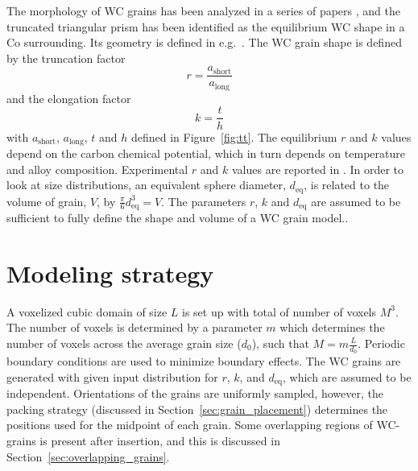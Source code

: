 \documentclass[3p,12pt]{elsarticle}
\begin{document}
The morphology of WC grains has been analyzed in a series of papers \cite{christensen_quantitative_2005,christensen_morphology_2007,lay_morphology_2008}, and the truncated triangular prism has been identified as the equilibrium WC shape in a Co surrounding.
Its geometry is defined in e.g.\ \cite{christensen_morphology_2007}.
The WC grain shape is defined by the truncation factor
\begin{equation}
	r = \frac{a_\text{short}}{a_\text{long}}
\end{equation}
and the elongation factor
\begin{equation}
	k = \frac{t}{h}
\end{equation}
with $a_\text{short}$, $a_\text{long}$, $t$ and $h$ defined in Figure~\ref{fig:tt}.
The equilibrium $r$ and $k$ values depend on the carbon chemical potential, which in turn depends on temperature and alloy composition.
Experimental $r$ and $k$ values are reported in \cite{lay_morphology_2008}.
In order to look at size distributions, an equivalent sphere diameter, $d_\text{eq}$, is related to the volume of grain, $V$, by $\frac{\pi}{6} d_\text{eq}^3 = V$.
The parameters $r$, $k$ and $d_\text{eq}$ are assumed to be sufficient to fully define the shape and volume of a WC grain model..

\section{Modeling strategy} \label{sec:strategy}

A voxelized cubic domain of size $L$ is set up with total of number of voxels $M^3$.
The number of voxels is determined by a parameter $m$ which determines the number of voxels across the average grain size ($d_0$), such that $M = m \frac{L}{d_0}$.
Periodic boundary conditions are used to minimize boundary effects.
The WC grains are generated with given input distribution for $r$, $k$, and $d_\text{eq}$, which are assumed to be independent.
Orientations of the grains are uniformly sampled, however, the packing strategy (discussed in Section~\ref{sec:grain_placement}) determines the positions used for the midpoint of each grain.
Some overlapping regions of WC-grains is present after insertion, and this is discussed in Section~\ref{sec:overlapping_grains}.
\end{document}
